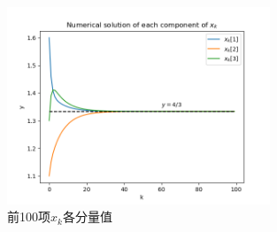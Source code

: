\begin{figure}[htbp]
    \begin{center}
        \includegraphics[width=0.7\textwidth]{img.png}
    \end{center}
   \caption[]{前100项$x_k$各分量值}
    \label{fig:img}
\end{figure}